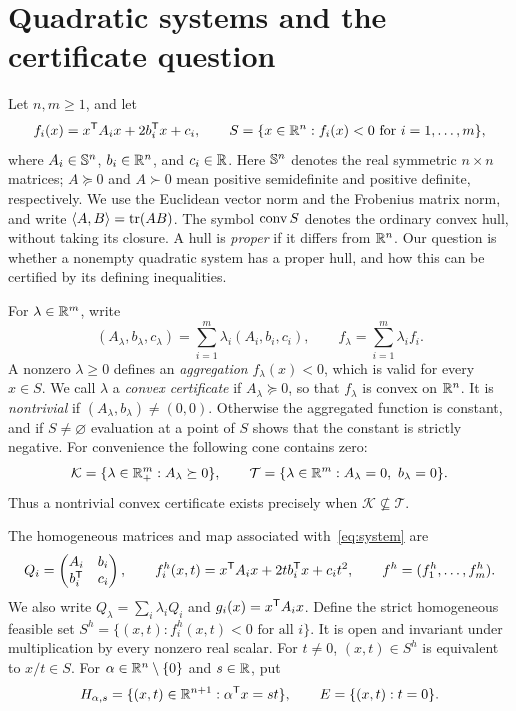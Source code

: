 \section{Quadratic systems and the certificate question}
\label{sec:setting}

Let $n,m\geq 1$, and let
\begin{equation}\label{eq:system}
 f_i(x)=x^{\mathsf T} A_i x+2b_i^{\mathsf T} x+c_i,
 \qquad
 S=\{x\in\mathbb R^n:f_i(x)<0\text{ for }i=1,\ldots,m\},
\end{equation}
where $A_i\in\mathbb S^n$, $b_i\in\mathbb R^n$, and $c_i\in\mathbb R$.
Here $\mathbb S^n$ denotes the real symmetric $n\times n$ matrices;
$A\succeq0$ and $A\succ0$ mean positive semidefinite and positive
definite, respectively. We use the Euclidean vector norm and the
Frobenius matrix norm, and write $\langle A,B\rangle=\operatorname{tr}(AB)$.
The symbol $\operatorname{conv} S$ denotes the ordinary convex hull, without taking
its closure. A hull is \emph{proper} if it differs from $\mathbb R^n$.
Our question is whether a nonempty quadratic system has a proper hull,
and how this can be certified by its defining inequalities.

For $\lambda\in\mathbb R^m$, write
\[
 (A_\lambda,b_\lambda,c_\lambda)
   =\sum_{i=1}^m\lambda_i(A_i,b_i,c_i),
 \qquad f_\lambda=\sum_{i=1}^m\lambda_i f_i.
\]
A nonzero $\lambda\geq0$ defines an \emph{aggregation}
$f_\lambda(x)<0$, which is valid for every $x\in S$.
We call $\lambda$ a \emph{convex certificate} if $A_\lambda\succeq0$,
so that $f_\lambda$ is convex on $\mathbb R^n$.
It is \emph{nontrivial} if $(A_\lambda,b_\lambda)\ne(0,0)$.
Otherwise the aggregated function is constant, and if $S\ne\varnothing$
evaluation at a point of $S$ shows that the constant is strictly
negative. For convenience the following cone contains zero:
\begin{equation}\label{eq:certificate-cone}
 \mathcal K=\{\lambda\in\mathbb R^m_+:A_\lambda\succeq0\},
 \qquad
 \mathcal T=\{\lambda\in\mathbb R^m:A_\lambda=0,\ b_\lambda=0\}.
\end{equation}
Thus a nontrivial convex certificate exists precisely when
$\mathcal K\not\subseteq\mathcal T$.

The homogeneous matrices and map associated with~\eqref{eq:system} are
\begin{equation}\label{eq:homogenization}
 Q_i=\begin{pmatrix}A_i&b_i\\b_i^{\mathsf T}&c_i\end{pmatrix},
 \qquad
 f_i^h(x,t)=x^{\mathsf T} A_i x+2t b_i^{\mathsf T} x+c_i t^2,
 \qquad f^h=(f_1^h,\ldots,f_m^h).
\end{equation}
We also write $Q_\lambda=\sum_i\lambda_iQ_i$ and
$g_i(x)=x^{\mathsf T} A_i x$.
Define the strict homogeneous feasible set
$S^h=\{(x,t):f_i^h(x,t)<0\text{ for all }i\}$.
It is open and invariant under multiplication by every nonzero real
scalar. For $t\ne0$, $(x,t)\in S^h$ is equivalent to $x/t\in S$.
For $\alpha\in\mathbb R^n\setminus\{0\}$ and $s\in\mathbb R$, put
\begin{equation}\label{eq:hyperplanes}
 H_{\alpha,s}=\{(x,t)\in\mathbb R^{n+1}:\alpha^{\mathsf T} x=st\},
 \qquad E=\{(x,t):t=0\}.
\end{equation}

